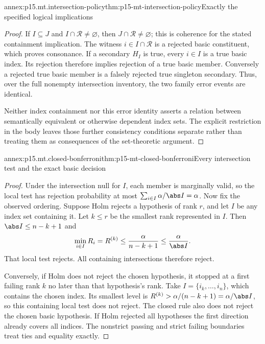 \begin{annexitem}{annex:p15.mt.intersection-policy}{thm:p15-mt-intersection-policy}{Exactly the specified logical implications}
\begin{proof}
If \(I\subseteq J\) and \(I\cap\mathcal R\ne\varnothing\), then
\(J\cap\mathcal R\ne\varnothing\); this is coherence for the stated
containment implication. The witness \(i\in I\cap\mathcal R\) is a
rejected basic constituent, which proves consonance.
If a secondary \(H_I\) is true, every \(i\in I\) is a true basic index.
Its rejection therefore implies rejection of a true basic member.
Conversely a rejected true basic member is a falsely rejected true
singleton secondary. Thus, over the full nonempty intersection
inventory, the two family error events are identical.

Neither index containment nor this error identity asserts a relation
between semantically equivalent or otherwise dependent index sets.
The explicit restriction in the body leaves those further consistency
conditions separate rather than treating them as consequences of the
set-theoretic argument.
\end{proof}
\end{annexitem}

\begin{annexitem}{annex:p15.mt.closed-bonferroni}{thm:p15-mt-closed-bonferroni}{Every intersection test and the exact basic decision}
\begin{proof}
Under the intersection null for \(I\), each member is marginally valid,
so the local test has rejection probability at most
\(\sum_{i\in I}\alpha/\abs I=\alpha\).
Now fix the observed ordering. Suppose Holm rejects a hypothesis of
rank \(r\), and let \(I\) be any index set containing it. Let \(k\leq r\)
be the smallest rank represented in \(I\). Then
\(\abs I\leq n-k+1\) and
\[
 \min_{i\in I}R_i=R^{(k)}
        \leq\frac{\alpha}{n-k+1}\leq\frac{\alpha}{\abs I}.
\]
That local test rejects. All containing intersections therefore reject.

Conversely, if Holm does not reject the chosen hypothesis, it stopped
at a first failing rank \(k\) no later than that hypothesis's rank.
Take \(I=\{i_k,\ldots,i_n\}\), which contains the chosen index.
Its smallest level is \(R^{(k)}>\alpha/(n-k+1)=\alpha/\abs I\),
so this containing local test does not reject. The closed rule also
does not reject the chosen basic hypothesis.
If Holm rejected all hypotheses the first direction already covers all
indices. The nonstrict passing and strict failing boundaries treat ties
and equality exactly.
\end{proof}
\end{annexitem}

